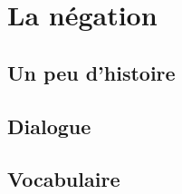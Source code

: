 \chapter{La négation}\label{Négation}

\section{Un peu d'histoire}
\section*{Dialogue}
\section*{Vocabulaire}